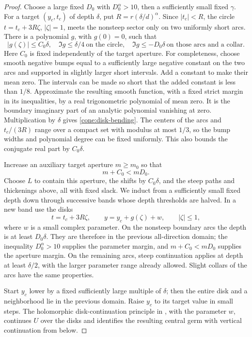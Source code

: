 \begin{proof}
Choose a large fixed \(D_0\) with \(D_0^\alpha>10\), then a sufficiently
small fixed \(\gamma\). For a target \((y_c,t_c)\) of depth \(\delta\),
put \(R=r(\delta/d)^\alpha\). Since \(|t_c|<R\), the circle
\(t=t_c+3R\zeta\), \(|\zeta|=1\), meets the nonsteep sector only on
two uniformly short arcs. There is a polynomial \(g\), with
\(g(0)=0\), such that
\begin{equation}\label{cone:disk-bending}
 |g(\zeta)|\le C_0\delta,
 \quad \Im g\le\delta/4\ \text{on the circle},
 \quad \Im g\le-D_0\delta\ \text{on those arcs and a collar}.
\end{equation}
Here \(C_0\) is fixed independently of the target aperture. For
completeness, choose smooth negative bumps equal to a sufficiently
large negative constant on the two arcs and supported in slightly
larger short intervals. Add a constant to make their mean zero.
The intervals can be made so short that the added constant is less
than \(1/8\). Approximate the resulting smooth function, with a fixed
strict margin in its inequalities, by a real trigonometric polynomial
of mean zero. It is the boundary imaginary part of an analytic
polynomial vanishing at zero. Multiplication by \(\delta\) gives
\eqref{cone:disk-bending}. The centers of the arcs and
\(t_c/(3R)\) range over a compact set with modulus at most \(1/3\),
so the bump widths and polynomial degree can be fixed uniformly.
This also bounds the conjugate real part by \(C_0\delta\).

Increase an auxiliary target aperture \(m\ge m_0\) so that
\[
 m+C_0<mD_0.
\]
Choose \(L\) to contain this aperture, the shifts by \(C_0\delta\),
and the steep paths and thickenings above, all with fixed slack. We
induct from a sufficiently small fixed depth down through successive
bands whose depth thresholds are halved. In a new band use the disks
\begin{equation}\label{cone:disks}
 t=t_c+3R\zeta,\qquad y=y_c+g(\zeta)+w,
 \qquad |\zeta|\le1,
\end{equation}
where \(w\) is a small complex parameter. On the nonsteep boundary
arcs the depth is at least \(D_0\delta\). They are therefore in the
previous all-direction domain; the inequality
\(D_0^\alpha>10\) supplies the parameter margin, and
\(m+C_0<mD_0\) supplies the aperture margin. On the remaining arcs,
steep continuation applies at depth at least \(\delta/2\), with the
larger parameter range already allowed. Slight collars of the arcs
have the same properties.

Start \(y_c\) lower by a fixed sufficiently large multiple of
\(\delta\); then the entire disk and a neighborhood lie in the
previous domain. Raise \(y_c\) to its target value in small steps.
The holomorphic disk-continuation principle in
, with the parameter \(w\),
continues \(U\) over the disks and identifies the resulting central
germ with vertical continuation from below.


\end{proof}
